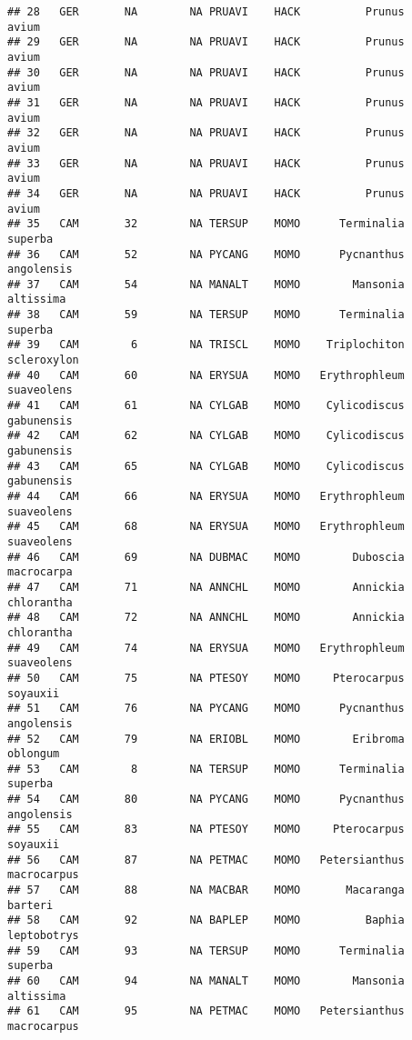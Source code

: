 \documentclass[]{article}
\begin{document}
\begin{verbatim}
## 28   GER       NA        NA PRUAVI    HACK          Prunus          avium
## 29   GER       NA        NA PRUAVI    HACK          Prunus          avium
## 30   GER       NA        NA PRUAVI    HACK          Prunus          avium
## 31   GER       NA        NA PRUAVI    HACK          Prunus          avium
## 32   GER       NA        NA PRUAVI    HACK          Prunus          avium
## 33   GER       NA        NA PRUAVI    HACK          Prunus          avium
## 34   GER       NA        NA PRUAVI    HACK          Prunus          avium
## 35   CAM       32        NA TERSUP    MOMO      Terminalia        superba
## 36   CAM       52        NA PYCANG    MOMO      Pycnanthus     angolensis
## 37   CAM       54        NA MANALT    MOMO        Mansonia      altissima
## 38   CAM       59        NA TERSUP    MOMO      Terminalia        superba
## 39   CAM        6        NA TRISCL    MOMO    Triplochiton    scleroxylon
## 40   CAM       60        NA ERYSUA    MOMO   Erythrophleum     suaveolens
## 41   CAM       61        NA CYLGAB    MOMO    Cylicodiscus     gabunensis
## 42   CAM       62        NA CYLGAB    MOMO    Cylicodiscus     gabunensis
## 43   CAM       65        NA CYLGAB    MOMO    Cylicodiscus     gabunensis
## 44   CAM       66        NA ERYSUA    MOMO   Erythrophleum     suaveolens
## 45   CAM       68        NA ERYSUA    MOMO   Erythrophleum     suaveolens
## 46   CAM       69        NA DUBMAC    MOMO        Duboscia     macrocarpa
## 47   CAM       71        NA ANNCHL    MOMO        Annickia     chlorantha
## 48   CAM       72        NA ANNCHL    MOMO        Annickia     chlorantha
## 49   CAM       74        NA ERYSUA    MOMO   Erythrophleum     suaveolens
## 50   CAM       75        NA PTESOY    MOMO     Pterocarpus       soyauxii
## 51   CAM       76        NA PYCANG    MOMO      Pycnanthus     angolensis
## 52   CAM       79        NA ERIOBL    MOMO        Eribroma       oblongum
## 53   CAM        8        NA TERSUP    MOMO      Terminalia        superba
## 54   CAM       80        NA PYCANG    MOMO      Pycnanthus     angolensis
## 55   CAM       83        NA PTESOY    MOMO     Pterocarpus       soyauxii
## 56   CAM       87        NA PETMAC    MOMO   Petersianthus    macrocarpus
## 57   CAM       88        NA MACBAR    MOMO       Macaranga        barteri
## 58   CAM       92        NA BAPLEP    MOMO          Baphia    leptobotrys
## 59   CAM       93        NA TERSUP    MOMO      Terminalia        superba
## 60   CAM       94        NA MANALT    MOMO        Mansonia      altissima
## 61   CAM       95        NA PETMAC    MOMO   Petersianthus    macrocarpus

\end{verbatim}
\end{document}
